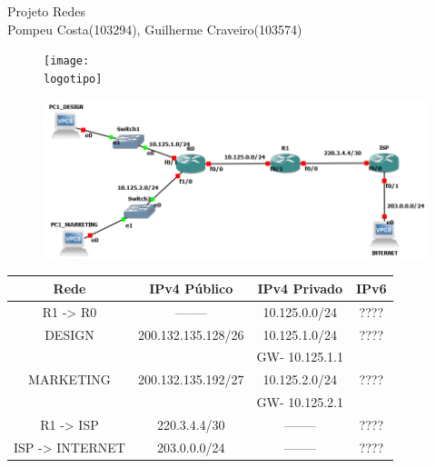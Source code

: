 \documentclass{report}
\begin{document}
%
\def\titulo{Projeto Redes}
\def\data{Dezembro 2021}
\def\autores{Pompeu Costa(103294), Guilherme Craveiro(103574)}
\def\logotipo{ua.pdf}
%
\begin{titlepage}

\begin{center}
%
\vspace*{50mm}
%
{\Huge \titulo}\\ 
%
\vspace{10mm}
%
%
\vspace{10mm}
%
{\LARGE \autores}\\ 
%
\vspace{30mm}
%
\begin{figure}[h]
\center
\texttt{[image: \\logotipo]}
\end{figure}
%
\vspace{30mm}
\end{center}
\end{titlepage}

\clearpage
{}

\begin{center}
\begin{figure}
    \centering
    \includegraphics[scale=0.65]{network.png}
\end{figure}
\end{center}
\begin{center}
    
\end{center}
\begin{tabular}{|c|c|c|c|}
    \hline
    Rede & IPv4 Público & IPv4 Privado & IPv6 \\
    \hline
    R1 -> R0 & -------- & 10.125.0.0/24 & ???? \\
    \hline
    DESIGN & 200.132.135.128/26 & 10.125.1.0/24 & ???? \\
    & & GW- 10.125.1.1 & \\
    \hline
    MARKETING & 200.132.135.192/27 & 10.125.2.0/24 & ???? \\
    & & GW- 10.125.2.1 & \\
    \hline
    R1 -> ISP & 220.3.4.4/30 & -------- & ???? \\
    \hline
    ISP -> INTERNET & 203.0.0.0/24 & -------- & ????\\
    \hline
\end{tabular}
\end{document}
